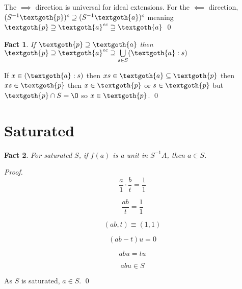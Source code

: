 \documentclass{article}
\newtheorem{theorem}{Fact}[section]
\begin{document}
\noindent
The $\implies$ direction is universal for ideal extensions. For the $\impliedby$ direction, 
$(S^{-1}\textgoth{p})^c \supseteq (S^{-1}\textgoth{a})^c$ meaning $\textgoth{p} \supseteq \textgoth{a}^{ec} \supseteq \textgoth{a}$
\qed

\begin{theorem}
If $\textgoth{p} \supseteq \textgoth{a}$ then $\textgoth{p} \supseteq \textgoth{a}^{ec} \supseteq \bigcup\limits_{s \in S} (\textgoth{a}:s)$
\end{theorem}

\noindent
If $x \in (\textgoth{a}:s)$ then $xs \in \textgoth{a} \subseteq \textgoth{p}$ then $xs \in \textgoth{p}$ then $x \in \textgoth{p}$ or $s \in \textgoth{p}$ but $\textgoth{p} \cap S = \O$ so $x \in \textgoth{p}$. 
\qed


\section{Saturated}

\begin{theorem}
For saturated $S$, if $f(a)$ is a unit in $S^{-1}A$, then $a \in S$.
\end{theorem}

\noindent
\textit{Proof.}
\[
  \frac{a}{1} \cdot \frac{b}{t} = \frac{1}{1} 
\]

\[
  \frac{ab}{t} = \frac{1}{1}
\]

\[
   (ab, t) \equiv (1, 1)
\]
 
\[
   (ab - t)u = 0
\]

\[
   abu = tu
\]

\[
   abu \in S
\]

As \( S \) is saturated, \( a \in S \).  \qed
\end{document}
